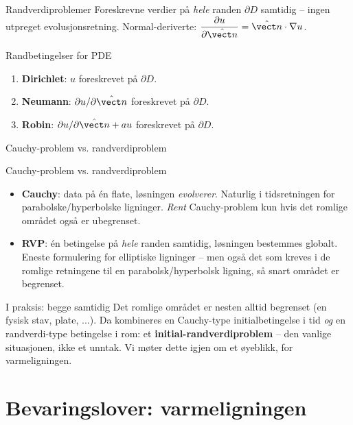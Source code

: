 \documentclass[11pt,aspectratio=169]{beamer}
\begin{document}
\begin{frame}{Randverdiproblemer}
Foreskrevne verdier på \emph{hele} randen $\partial D$ samtidig -- ingen utpreget evolusjonsretning. Normal-deriverte: $\dfrac{\partial u}{\partial\hat{\vect n}}=\hat{\vect n}\cdot\nabla u$.
\begin{oppsumb}{Randbetingelser for PDE}
\begin{enumerate}
\item \textbf{Dirichlet}: $u$ foreskrevet på $\partial D$.
\item \textbf{Neumann}: $\partial u/\partial\hat{\vect n}$ foreskrevet på $\partial D$.
\item \textbf{Robin}: $\partial u/\partial\hat{\vect n} + au$ foreskrevet på $\partial D$.
\end{enumerate}
\end{oppsumb}
\end{frame}

\begin{frame}{Cauchy-problem vs. randverdiproblem}
\begin{oppsumb}{Cauchy-problem vs. randverdiproblem}
\begin{itemize}
\item \textbf{Cauchy}: data på én flate, løsningen \emph{evolverer}. Naturlig i tidsretningen for parabolske/hyperbolske ligninger. \emph{Rent} Cauchy-problem kun hvis det romlige området også er ubegrenset.
\item \textbf{RVP}: én betingelse på \emph{hele} randen samtidig, løsningen bestemmes globalt. Eneste formulering for elliptiske ligninger -- men også det som kreves i de romlige retningene til en parabolsk/hyperbolsk ligning, så snart området er begrenset.
\end{itemize}
\end{oppsumb}
\begin{remb}{I praksis: begge samtidig}
Det romlige området er nesten alltid begrenset (en fysisk stav, plate, ...). Da kombineres en Cauchy-type initialbetingelse i tid \emph{og} en randverdi-type betingelse i rom: et \textbf{initial-randverdiproblem} -- den vanlige situasjonen, ikke et unntak. Vi møter dette igjen om et øyeblikk, for varmeligningen.
\end{remb}
\end{frame}

\section{Bevaringslover: varmeligningen}
\end{document}

